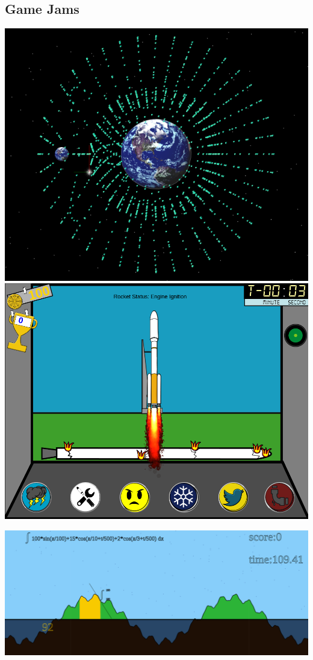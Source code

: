 \documentclass[../resume.tex]{subfiles}
\begin{document}
\subsection{Game Jams}
\href{https://github.com/randompast/gravityparticles}{\includegraphics[scale=0.29]{../fun/orbit_hopper.png}}
\href{https://github.com/flyinactor91/Launch-Down}{\includegraphics[scale=0.2]{../fun/liftoff.png}}

\noindent
\includegraphics[scale=0.285]{../fun/startupweekend.png} 
\end{document}
